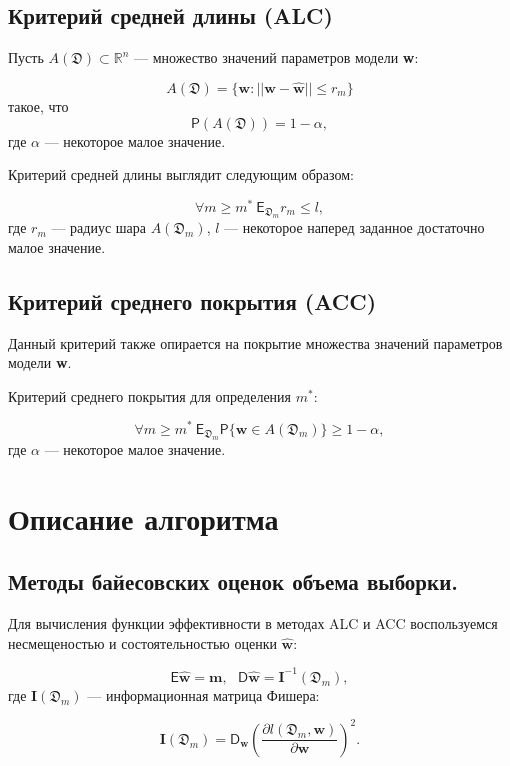 \documentclass[12pt,twoside]{article}
\begin{document}
\subsection{Критерий средней длины (ALC)}

Пусть $A(\mathfrak{D}) \subset \mathbb{R}^n$ --- множество значений параметров модели \textbf{w}:

$$
A(\mathfrak{D}) = \{\textbf{w} : ||\textbf{w}- \hat{\textbf{w}}|| \leqslant r_m\}
$$
такое, что
$$
\mathsf{P}(A(\mathfrak{D})) = 1 - \alpha,
$$
где $\alpha$ --- некоторое малое значение. 

Критерий средней длины выглядит следующим образом:

$$
\forall m \geqslant  m^{*}~\mathsf{E}_{\mathfrak D_m} r_m \leqslant l , 
$$
где $r_m$ --- радиус шара $A(\mathfrak{D}_m)$, $l$ --- некоторое наперед заданное достаточно малое значение.

\subsection{Критерий среднего покрытия (ACC)}

Данный критерий также опирается на покрытие множества значений параметров модели \textbf{w}.

Критерий среднего покрытия для определения $m^{*}$:

$$
\forall m \geqslant m^{*}~\mathsf{E}_{\mathfrak D_m} \mathsf{P}\{\textbf{w} \in A(\mathfrak D_m)\} \geqslant 1 - \alpha,
$$
где $\alpha$ --- некоторое малое значение.

\section{Описание алгоритма}

\subsection{Методы байесовских оценок объема выборки.}  Для вычисления функции эффективности в методах ALC и ACC  воспользуемся несмещеностью и состоятельностью оценки $\hat{\textbf{w}}$:

\begin{equation}\label{w_hat_I}
\mathsf{E}\hat{\textbf{w}} = \textbf{m}, ~~~\mathsf{D}\hat{\textbf{w}} = \textbf{I}^{-1}(\mathfrak D_m),
\end{equation}
где $\textbf{I}(\mathfrak D_m)$ --- информационная матрица Фишера:

$$
\textbf{I}(\mathfrak D_m) = \mathsf{D}_{\textbf{w}}\left(\frac{\partial l(\mathfrak D_m, \textbf{w})}{\partial \textbf{w}}\right)^2.
$$
\end{document}
